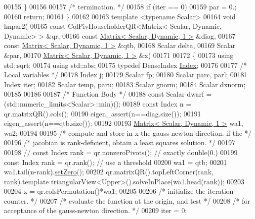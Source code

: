\begin{DoxyCode}
00155     \}
00156 
00157     \textcolor{comment}{/* termination. */}
00158     \textcolor{keywordflow}{if} (iter == 0)
00159         par = 0.;
00160     \textcolor{keywordflow}{return};
00161 \}
00162 
00163 \textcolor{keyword}{template} <\textcolor{keyword}{typename} Scalar>
00164 \textcolor{keywordtype}{void} lmpar2(
00165         \textcolor{keyword}{const} ColPivHouseholderQR<Matrix< Scalar, Dynamic, Dynamic> > &qr,
00166         \textcolor{keyword}{const} \hyperlink{group___core___module}{Matrix< Scalar, Dynamic, 1 >}  &diag,
00167         \textcolor{keyword}{const} \hyperlink{group___core___module}{Matrix< Scalar, Dynamic, 1 >}  &qtb,
00168         Scalar delta,
00169         Scalar &par,
00170         \hyperlink{group___core___module}{Matrix< Scalar, Dynamic, 1 >}  &x)
00171 
00172 \{
00173     \textcolor{keyword}{using} std::sqrt;
00174     \textcolor{keyword}{using} std::abs;
00175     \textcolor{keyword}{typedef} DenseIndex \hyperlink{namespace_eigen_a62e77e0933482dafde8fe197d9a2cfde}{Index};
00176 
00177     \textcolor{comment}{/* Local variables */}
00178     Index j;
00179     Scalar fp;
00180     Scalar parc, parl;
00181     Index iter;
00182     Scalar temp, paru;
00183     Scalar gnorm;
00184     Scalar dxnorm;
00185 
00186 
00187     \textcolor{comment}{/* Function Body */}
00188     \textcolor{keyword}{const} Scalar dwarf = (std::numeric\_limits<Scalar>::min)();
00189     \textcolor{keyword}{const} Index n = qr.matrixQR().cols();
00190     eigen\_assert(n==diag.size());
00191     eigen\_assert(n==qtb.size());
00192 
00193     \hyperlink{group___core___module}{Matrix< Scalar, Dynamic, 1 >}  wa1, wa2;
00194 
00195     \textcolor{comment}{/* compute and store in x the gauss-newton direction. if the */}
00196     \textcolor{comment}{/* jacobian is rank-deficient, obtain a least squares solution. */}
00197 
00198 \textcolor{comment}{//    const Index rank = qr.nonzeroPivots(); // exactly double(0.)}
00199     \textcolor{keyword}{const} Index rank = qr.rank(); \textcolor{comment}{// use a threshold}
00200     wa1 = qtb;
00201     wa1.tail(n-rank).\hyperlink{class_eigen_1_1_plain_object_base_ac21ad5f989f320e46958b75ac8d9a1da}{setZero}();
00202     qr.matrixQR().topLeftCorner(rank, rank).template triangularView<Upper>().solveInPlace(wa1.head(rank));
00203 
00204     x = qr.colsPermutation()*wa1;
00205 
00206     \textcolor{comment}{/* initialize the iteration counter. */}
00207     \textcolor{comment}{/* evaluate the function at the origin, and test */}
00208     \textcolor{comment}{/* for acceptance of the gauss-newton direction. */}
00209     iter = 0;

\end{DoxyCode}

